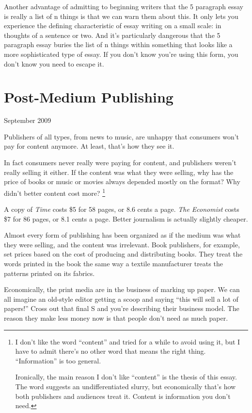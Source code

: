 \documentclass[12pt]{book}
\begin{document}
Another advantage of admitting to beginning writers that the 5 paragraph
essay is really a list of n things is that we can warn them about this.
It only lets you experience the defining characteristic of essay writing
on a small scale: in thoughts of a sentence or two. And it's
particularly dangerous that the 5 paragraph essay buries the list of n
things within something that looks like a more sophisticated type of
essay. If you don't know you're using this form, you don't know you need
to escape it.
\chapter{Post-Medium Publishing}

September 2009

Publishers of all types, from news to music, are unhappy that consumers
won't pay for content anymore. At least, that's how they see it.

In fact consumers never really were paying for content, and publishers
weren't really selling it either. If the content was what they were
selling, why has the price of books or music or movies always depended
mostly on the format? Why didn't better content cost more?
\footnote{I don't like the word ``content'' and tried for a while to avoid
using it, but I have to admit there's no other word that means the right
thing. ``Information'' is too general.

Ironically, the main reason I don't like ``content'' is the thesis of
this essay. The word suggests an undifferentiated slurry, but
economically that's how both publishers and audiences treat it. Content
is information you don't need.}

A copy of \emph{Time} costs \$5 for 58 pages, or 8.6 cents a page.
\emph{The Economist} costs \$7 for 86 pages, or 8.1 cents a page. Better
journalism is actually slightly cheaper.

Almost every form of publishing has been organized as if the medium was
what they were selling, and the content was irrelevant. Book publishers,
for example, set prices based on the cost of producing and distributing
books. They treat the words printed in the book the same way a textile
manufacturer treats the patterns printed on its fabrics.

Economically, the print media are in the business of marking up paper.
We can all imagine an old-style editor getting a scoop and saying ``this
will sell a lot of papers!'' Cross out that final S and you're
describing their business model. The reason they make less money now is
that people don't need as much paper.
\end{document}

